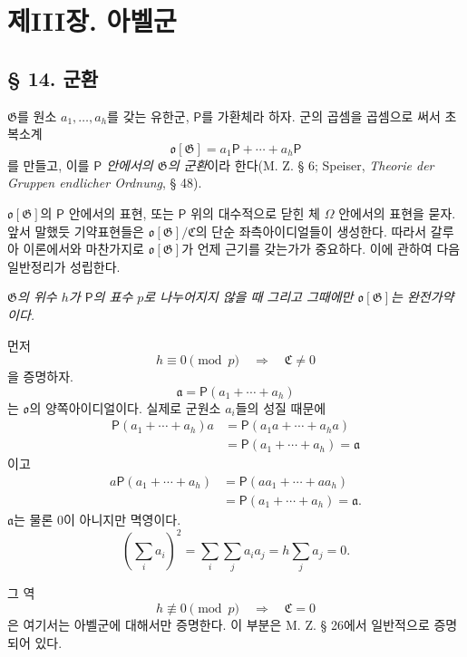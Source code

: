 \section*{제III장. 아벨군}

\subsection*{§ 14. 군환}

\(\mathfrak G\)를 원소 \(a_1,\ldots,a_h\)를 갖는 유한군, \(\mathsf P\)를 가환체라 하자. 군의 곱셈을 곱셈으로 써서 초복소계
\[
        \mathfrak o[\mathfrak G]
        =a_1\mathsf P+\cdots+a_h\mathsf P
\]
를 만들고, 이를 \emph{\(\mathsf P\) 안에서의 \(\mathfrak G\)의 군환}이라 한다(M. Z. § 6; Speiser, \emph{Theorie der Gruppen endlicher Ordnung}, § 48).

\(\mathfrak o[\mathfrak G]\)의 \(\mathsf P\) 안에서의 표현, 또는 \(\mathsf P\) 위의 대수적으로 닫힌 체 \(\Omega\) 안에서의 표현을 묻자. 앞서 말했듯 기약표현들은 \(\mathfrak o[\mathfrak G]/\mathfrak C\)의 단순 좌측아이디얼들이 생성한다. 따라서 갈루아 이론에서와 마찬가지로 \(\mathfrak o[\mathfrak G]\)가 언제 근기를 갖는가가 중요하다. 이에 관하여 다음 일반정리가 성립한다.

\begin{center}
\emph{\(\mathfrak G\)의 위수 \(h\)가 \(\mathsf P\)의 표수 \(p\)로 나누어지지 않을 때 그리고 그때에만 \(\mathfrak o[\mathfrak G]\)는 완전가약이다.}
\end{center}

먼저
\[
        h\equiv0\pmod p\quad\Longrightarrow\quad
        \mathfrak C\ne0
\]
을 증명하자.
\[
        \mathfrak a
        =\mathsf P(a_1+\cdots+a_h)
\]
는 \(\mathfrak o\)의 양쪽아이디얼이다. 실제로 군원소 \(a_i\)들의 성질 때문에
\[
\begin{aligned}
\mathsf P(a_1+\cdots+a_h)a
&=\mathsf P(a_1a+\cdots+a_ha)\\
&=\mathsf P(a_1+\cdots+a_h)=\mathfrak a
\end{aligned}
\]
이고
\[
\begin{aligned}
a\mathsf P(a_1+\cdots+a_h)
&=\mathsf P(aa_1+\cdots+aa_h)\\
&=\mathsf P(a_1+\cdots+a_h)=\mathfrak a.
\end{aligned}
\]
\(\mathfrak a\)는 물론 0이 아니지만 멱영이다.
\[
        \left(\sum_i a_i\right)^2
        =\sum_i\sum_j a_i a_j
        =h\sum_j a_j=0.
\]

그 역
\[
        h\not\equiv0\pmod p\quad\Longrightarrow\quad
        \mathfrak C=0
\]
은 여기서는 아벨군에 대해서만 증명한다. 이 부분은 M. Z. § 26에서 일반적으로 증명되어 있다.

